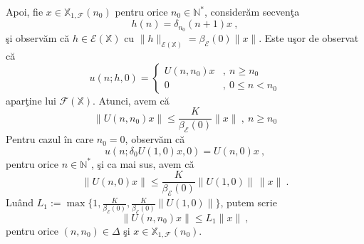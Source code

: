 \documentclass[ a4paper, 12pt]{report}
\newcommand{\E}{\mathcal{E}}
\newcommand{\F}{\mathcal{F}}
\newcommand{\N}{\mathbb{N}}
\newcommand{\X}{\mathbb{X}}
\theoremstyle{definition}
\theoremstyle{remark}
\numberwithin{equation}{section}
\begin{document}
Apoi, fie $x\in\X_{1,\F}(n_0)$ pentru orice $n_0\in\N^*$, consider\u am secven\c ta
\begin{equation}
h(n)=\delta_{n_0}(n+1)x \ ,
\end{equation}
\c si observ\u am c\u a $h\in\E(\X)$ cu $\|h\|_{\E(\X)}=\beta_{\E}(0)\|x\|$. Este u\c sor de observat c\u a
$$u(n;h,0) = \begin{cases}
U(n,n_0)x &,\ n\geq n_0\\
0 &,\ 0\leq n< n_0
\end{cases}
$$
apar\c tine lui $\F(\X)$. Atunci, avem c\u a
\begin{equation}
\|U(n,n_0)x\|\leq \frac{K}{\beta_{\E}(0)}\|x\|\ ,\ n\geq n_0
\end{equation}
Pentru cazul \^in care $n_0=0$, observ\u am c\u a
$$u(n;\delta_0 U(1,0)x,0)= U(n,0)x\ ,$$
pentru orice $n\in\N^*$, \c si ca mai sus, avem c\u a
\begin{equation}
\|U(n,0)x\|\leq \frac{K}{\beta_{\E}(0)}\|U(1,0)\|\,\|x\|\ .
\end{equation}
Lu\^and $L_1:=\max\{1, \frac{K}{\beta_{\E}(0)}, \frac{K}{\beta_{\E}(0)}\|U(1,0)\|\}$, putem scrie
$$\|U(n,n_0)x\|\leq L_1\|x\|\ ,$$
pentru orice $(n,n_0)\in\Delta$ \c si $x\in\X_{1,\F}(n_0)$.
\end{document}
